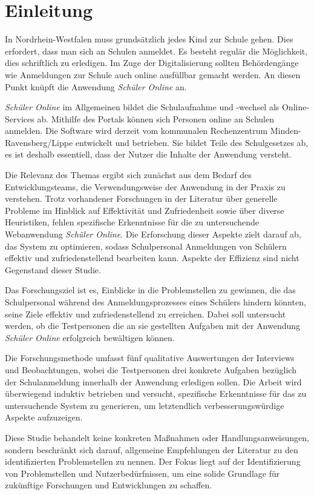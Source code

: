 \section{Einleitung}
In Nordrhein-Westfalen muss grundsätzlich jedes Kind zur Schule gehen.\cite{SchulG_NRW_35} Dies erfordert, dass man sich an Schulen anmeldet. Es besteht regulär die Möglichkeit, dies schriftlich zu erledigen. Im Zuge der Digitalisierung sollten Behördengänge wie Anmeldungen zur Schule auch online ausfüllbar gemacht werden. An diesen Punkt knüpft die Anwendung \textit{Schüler Online} an.

\textit{Schüler Online} im Allgemeinen bildet die Schulaufnahme und -wechsel als Online-Services ab. Mithilfe des Portals können sich Personen online an Schulen anmelden. Die Software wird derzeit vom kommunalen Rechenzentrum Minden-Ravensberg/Lippe entwickelt und betrieben. Sie bildet Teile des Schulgesetzes ab, es ist deshalb essentiell, dass der Nutzer die Inhalte der Anwendung versteht. 

Die Relevanz des Themas ergibt sich zunächst aus dem Bedarf des Entwicklungsteams, die Verwendungsweise der Anwendung in der Praxis zu verstehen. Trotz vorhandener Forschungen in der Literatur über generelle Probleme im Hinblick auf Effektivität und Zufriedenheit sowie über diverse Heuristiken, fehlen spezifische Erkenntnisse für die zu untersuchende Webanwendung \textit{Schüler Online}. Die Erforschung dieser Aspekte zielt darauf ab, das System zu optimieren, sodass Schulpersonal Anmeldungen von Schülern effektiv und zufriedenstellend bearbeiten kann. Aspekte der Effizienz sind nicht Gegenstand dieser Studie.

Das Forschungsziel ist es, Einblicke in die Problemstellen zu gewinnen, die das Schulpersonal während des Anmeldungsprozesses eines Schülers hindern könnten, seine Ziele effektiv und zufriedenstellend zu erreichen. Dabei soll untersucht werden, ob die Testpersonen die an sie gestellten Aufgaben mit der Anwendung \textit{Schüler Online} erfolgreich bewältigen können. 

Die Forschungsmethode umfasst fünf qualitative Auswertungen der Interviews und Beobachtungen, wobei die Testpersonen drei konkrete Aufgaben bezüglich der Schulanmeldung innerhalb der Anwendung erledigen sollen. Die Arbeit wird überwiegend induktiv betrieben und versucht, spezifische Erkenntnisse für das zu untersuchende System zu generieren, um letztendlich verbesserungswürdige Aspekte aufzuzeigen.

Diese Studie behandelt keine konkreten Maßnahmen oder Handlungsanweisungen, sondern beschränkt sich darauf, allgemeine Empfehlungen der Literatur zu den identifizierten Problemstellen zu nennen. Der Fokus liegt auf der Identifizierung von Problemstellen und Nutzerbedürfnissen, um eine solide Grundlage für zukünftige Forschungen und Entwicklungen zu schaffen.

